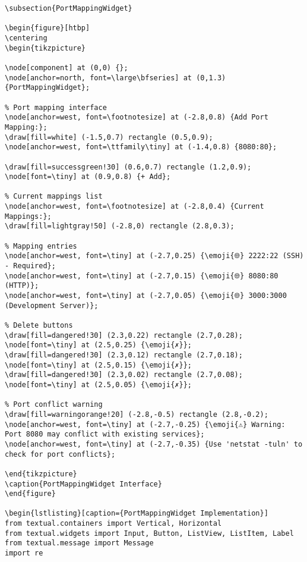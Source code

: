 \documentclass[11pt,a4paper]{article}
\newcommand{\emoji}[1]{{\emojifont #1}}
\begin{document}
\begin{lstlisting}[caption={ValidatedInput Implementation}]
\subsection{PortMappingWidget}

\begin{figure}[htbp]
\centering
\begin{tikzpicture}

\node[component] at (0,0) {};
\node[anchor=north, font=\large\bfseries] at (0,1.3) {PortMappingWidget};

% Port mapping interface
\node[anchor=west, font=\footnotesize] at (-2.8,0.8) {Add Port Mapping:};
\draw[fill=white] (-1.5,0.7) rectangle (0.5,0.9);
\node[anchor=west, font=\ttfamily\tiny] at (-1.4,0.8) {8080:80};

\draw[fill=successgreen!30] (0.6,0.7) rectangle (1.2,0.9);
\node[font=\tiny] at (0.9,0.8) {+ Add};

% Current mappings list
\node[anchor=west, font=\footnotesize] at (-2.8,0.4) {Current Mappings:};
\draw[fill=lightgray!50] (-2.8,0) rectangle (2.8,0.3);

% Mapping entries
\node[anchor=west, font=\tiny] at (-2.7,0.25) {\emoji{🌐} 2222:22 (SSH) - Required};
\node[anchor=west, font=\tiny] at (-2.7,0.15) {\emoji{🌐} 8080:80 (HTTP)};
\node[anchor=west, font=\tiny] at (-2.7,0.05) {\emoji{🌐} 3000:3000 (Development Server)};

% Delete buttons
\draw[fill=dangered!30] (2.3,0.22) rectangle (2.7,0.28);
\node[font=\tiny] at (2.5,0.25) {\emoji{✗}};
\draw[fill=dangered!30] (2.3,0.12) rectangle (2.7,0.18);
\node[font=\tiny] at (2.5,0.15) {\emoji{✗}};
\draw[fill=dangered!30] (2.3,0.02) rectangle (2.7,0.08);
\node[font=\tiny] at (2.5,0.05) {\emoji{✗}};

% Port conflict warning
\draw[fill=warningorange!20] (-2.8,-0.5) rectangle (2.8,-0.2);
\node[anchor=west, font=\tiny] at (-2.7,-0.25) {\emoji{⚠} Warning: Port 8080 may conflict with existing services};
\node[anchor=west, font=\tiny] at (-2.7,-0.35) {Use 'netstat -tuln' to check for port conflicts};

\end{tikzpicture}
\caption{PortMappingWidget Interface}
\end{figure}

\begin{lstlisting}[caption={PortMappingWidget Implementation}]
from textual.containers import Vertical, Horizontal
from textual.widgets import Input, Button, ListView, ListItem, Label
from textual.message import Message
import re


\end{lstlisting}
\end{document}
